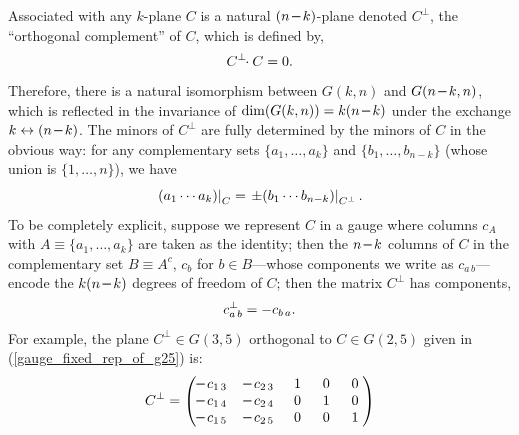 \documentclass[12pt,hyperref,compress]{JHEP3}
\newcommand{\eq}[1]{\begin{equation}#1\end{equation}}
\newcommand{\mi}{{\rm\rule[2.4pt]{6pt}{0.65pt}}}
\begin{document}
Associated with any $k$-plane $C$ is a natural $(n\,\mi\,k)$-plane denoted $C^\perp$, the ``orthogonal complement'' of $C$, which is defined by,
\vspace{-.2cm}\eq{C^{\perp}\!\!\cdot C=0.\vspace{-.2cm}}
Therefore, there is a natural isomorphism between $G(k,n)$ and $G(n\,\mi\,k,n)$, which is reflected in the invariance of $\dim(G(k,n))=k(n\,\mi\,k)$ under the exchange $k\leftrightarrow(n\,\mi\,k)$. The minors of $C^{\perp}$ are fully determined by the minors of $C$ in the obvious way: for any complementary sets $\{a_1,\ldots,a_k\}$ and $\{b_1,\ldots,b_{n-k}\}$ (whose union is $\{1,\ldots,n\}$), we have
\vspace{-.2cm}\eq{\left.(a_1 \cdots a_k)\right|_{C}=\left.\pm(b_1\cdots b_{n-k})\right|_{C^{\perp}}.\vspace{-.1cm}}
To be completely explicit, suppose we represent $C$ in a gauge where columns $c_A$ with $A\equiv\{a_1,\ldots,a_k\}$ are taken as the identity; then the $n\,\mi\,k$ columns of $C$ in the complementary set $B\equiv A^c$, $c_{b}$ for $b\!\in\! B$---whose components we write as $c_{a\,b}$---encode the $k(n\,\mi\,k)$ degrees of freedom of $C$; then the matrix $C^{\perp}$ has components,
\vspace{-.2cm}\eq{c^{\perp}_{a\,b}=-c_{b\,a}.\vspace{-.2cm}}
For example, the plane $C^\perp\!\in\! G(3,5)$ orthogonal to $C\!\in\! G(2,5)$ given in (\ref{gauge_fixed_rep_of_g25}) is:
\vspace{-.2cm}\eq{
C^\perp= \left(\begin{array}{@{}ccccc@{}}\mi\,c_{1\,3}\,& \mi\,c_{2\,3}\,&\;1\;&\;0\;&\;0\;\\\mi\,c_{1\,4}\,& \mi\,c_{2\,4}\,& 0 & 1 & 0 \\ \mi\,c_{1\,5}\,& \mi\,c_{2\,5}\,&
0 & 0 & 1 \end{array} \right)
\vspace{-.2cm}}
\end{document}

